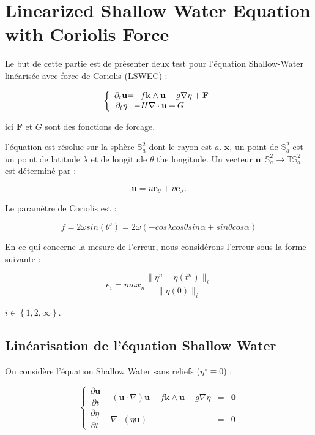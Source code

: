 \chapter{Linearized Shallow Water Equation with Coriolis Force}

Le but de cette partie est de présenter deux test pour l'équation Shallow-Water linéarisée avec force de Coriolis (LSWEC) :

\begin{equation}
\label{LSWEC}
\left\lbrace
\begin{array}{r @{=} l}
\partial_t \mathbf{u} & -f \mathbf{k} \wedge \mathbf{u} - g \nabla \eta + \mathbf{F} \\
\partial_t \eta & -H \nabla \cdot \mathbf{u} + G
\end{array}
\right.
\end{equation}

ici $\mathbf{F}$ et $G$ sont des fonctions de forcage.

l'équation est résolue sur la sphère $\mathbb{S}_a^2$ dont le rayon est $a$. $\mathbf{x}$, un point de $\mathbb{S}_a^2$ est un point de latitude $\lambda$ et de longitude $\theta$ the longitude. Un vecteur $\mathbf{u} : \mathbb{S}_a^2 \rightarrow \mathbb{T}\mathbb{S}_a^2$ est déterminé par :

$$\mathbf{u} = u \mathbf{e}_{\theta} + v \mathbf{e}_{\lambda}.$$ 

Le paramètre de Coriolis est :

\begin{equation}
f=2 \omega sin ( \theta' ) = 2 \omega \left( -cos \lambda cos \theta sin \alpha + sin \theta cos \alpha \right)
\label{coriolis_parameter}
\end{equation}

En ce qui concerne la mesure de l'erreur, nous considérons l'erreur sous la forme suivante :

$$e_{i} = max_n \dfrac{\| \eta^n - \eta(t^n) \|_{i}}{\| \eta(0) \|_{i}}$$

$i \in \left\lbrace 1, 2, \infty \right\rbrace$.

\section{Linéarisation de l'équation Shallow Water}

On considère l'équation Shallow Water sans reliefs ($\eta^{\star} \equiv 0$) :

\begin{equation}
\label{eq:SWE_without relief}
\left\lbrace
\begin{array}{rcl}
\dfrac{\partial \mathbf{u}}{\partial t} + \left( \mathbf{u} \cdot \nabla \right) \mathbf{u} + f \mathbf{k} \wedge \mathbf{u} + g \nabla \eta & = & \mathbf{0} \\
\dfrac{\partial \eta}{\partial t} + \nabla \cdot \left( \eta \mathbf{u} \right) & = & 0
\end{array}
\right.
\end{equation}

